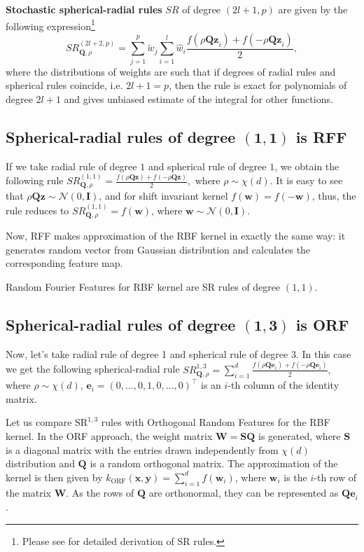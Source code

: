 \textbf{Stochastic spherical-radial rules} $SR$ of degree $(2l + 1, p)$ are given by the following expression\footnote{Please see \cite{genz1998stochastic} for detailed derivation of SR rules.}
\[
SR^{(2l + 2, p)}_{\mathbf{Q}, \rho} = \sum_{j = 1}^p \widetilde{w}_j
\sum_{i = 1}^{l} \hat{w}_i \frac{f(\rho\mathbf{Qz}_i) + f(-\rho \mathbf{Qz}_i)}{2},
\]
where the distributions of weights are such that if degrees of radial rules and spherical rules coincide, i.e. $2l + 1 = p$, then the rule is exact for polynomials of degree $2l + 1$ and gives unbiased estimate of the integral for other functions.

\subsection{Spherical-radial rules of degree $\boldsymbol{(1, 1)}$ is RFF} If we take radial rule of degree $1$ and spherical rule of degree $1$, we obtain the following rule $SR^{(1, 1)}_{\mathbf{Q}, \rho} = \frac{f(\rho \mathbf{Qz}) + f(-\rho\mathbf{Qz})}{2},$
where $\rho \sim \chi(d)$.
It is easy to see that ${\rho \mathbf{Qz} \sim \mathcal{N}(0, \mathbf{I})}$,
and for shift invariant kernel ${f(\mathbf{w}) = f(-\mathbf{w})}$, thus, the rule reduces to ${SR^{(1, 1)}_{\mathbf{Q}, \rho} = f(\mathbf{w})}$, where ${\mathbf{w} \sim \mathcal{N}(0, \mathbf{I}).}$

Now, RFF \citep{rahimi2008random} makes approximation of the RBF kernel in exactly the same way: it generates random vector from Gaussian distribution and calculates the corresponding feature map.

\begin{proposition}
Random Fourier Features for RBF kernel are SR rules of degree $(1, 1)$.
\end{proposition}

\subsection{Spherical-radial rules of degree $\boldsymbol{(1, 3)}$ is ORF} Now, let's take radial rule of degree 1 and spherical rule of degree 3. In this case we get the following spherical-radial rule ${SR^{1, 3}_{\mathbf{Q}, \rho} = \sum_{i = 1}^d
\frac{f(\rho\mathbf{Qe}_i) + f(-\rho\mathbf{Qe}_i)}{2},}$
where ${\rho \sim \chi(d)}$,
${\mathbf{e}_i = (0, \ldots, 0, 1, 0, \ldots, 0)^{\boldsymbol{\top}}}$
is an $i$-th column of the identity matrix.

Let us compare $\text{SR}^{1,3}$ rules with Orthogonal Random Features \citep{felix2016orthogonal} for the RBF kernel. In the ORF approach, the weight matrix $\mathbf{W} = \mathbf{SQ}$ is generated, where $\mathbf{S}$ is a diagonal matrix with the entries drawn independently from $\chi(d)$ distribution and $\mathbf{Q}$ is a random orthogonal matrix. The approximation of the kernel is then given by
$k_{\text{ORF}}(\mathbf{x}, \mathbf{y}) = \sum_{i = 1}^d f(\mathbf{w}_i)$, where $\mathbf{w}_i$ is the $i$-th row of the matrix $\mathbf{W}$.
As the rows of $\mathbf{Q}$ are orthonormal, they can be represented as $\mathbf{Qe}_i$.

